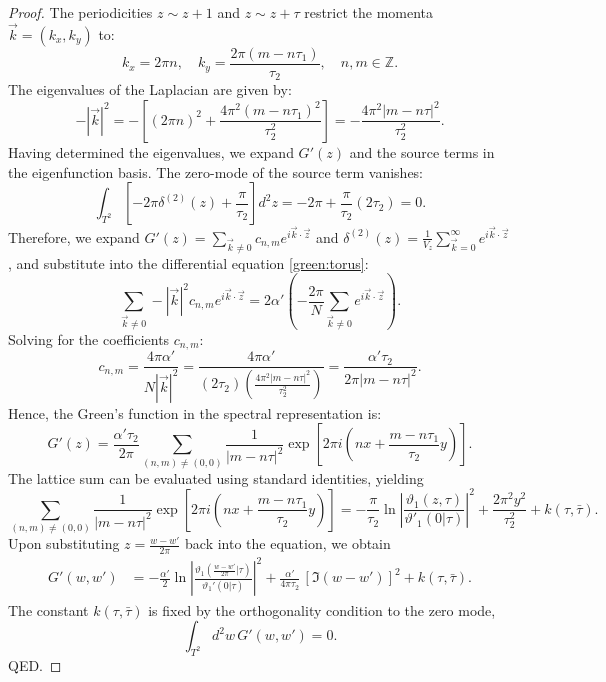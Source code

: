 \begin{tcolorbox}[breakable]
\begin{proof}
The periodicities $z \sim z+1$ and $z \sim z+\tau$ restrict the momenta $\vec{k} = (k_x, k_y)$ to:
\begin{equation}
	k_x = 2\pi n, \quad k_y = \frac{2\pi(m - n\tau_1)}{\tau_2}, \quad n, m \in \mathbb{Z}.
\end{equation}
The eigenvalues of the Laplacian are given by:
\begin{equation}
	-|\vec{k}|^2 = -\left[ (2\pi n)^2 + \frac{4\pi^2(m - n\tau_1)^2}{\tau_2^2} \right] = -\frac{4\pi^2 |m - n\tau|^2}{\tau_2^2}.
\end{equation}
Having determined the eigenvalues, we expand $G'(z)$ and the source terms in the eigenfunction basis. The zero-mode of the source term vanishes:
\begin{equation}
	\int_{T^2} \left[ -2\pi \delta^{(2)}(z) + \frac{\pi}{\tau_2} \right]d^2z = -2\pi + \frac{\pi}{\tau_2}(2\tau_2) = 0.
\end{equation}
Therefore, we expand $G'(z) = \sum_{\vec{k} \neq 0} c_{n,m} e^{i\vec{k} \cdot \vec{z}}$ and $\delta^{(2)}(z)=\frac{1}{V_z}\sum_{\vec{k}=0}^{\infty}e^{i\vec{k}\cdot\vec{z}}$, and substitute into the differential equation \eqref{green:torus}:
\begin{equation}
	\sum_{\vec{k} \neq 0} -|\vec{k}|^2 c_{n,m} e^{i\vec{k} \cdot \vec{z}} = 2\alpha' \left( -\frac{2\pi}{N} \sum_{\vec{k} \neq 0} e^{i\vec{k} \cdot \vec{z}} \right).
\end{equation}
Solving for the coefficients $c_{n,m}$:
\begin{equation}
	c_{n,m} = \frac{4\pi \alpha'}{N |\vec{k}|^2} = \frac{4\pi \alpha'}{(2\tau_2) \left( \frac{4\pi^2 |m - n\tau|^2}{\tau_2^2} \right)} = \frac{\alpha' \tau_2}{2\pi |m - n\tau|^2}.
\end{equation}
Hence, the Green's function in the spectral representation is:
\begin{equation}
	G'(z) = \frac{\alpha' \tau_2}{2\pi} \sum_{(n,m) \neq (0,0)} \frac{1}{|m - n\tau|^2} \exp \left[ 2\pi i \left( nx + \frac{m - n\tau_1}{\tau_2}y \right) \right].
\end{equation}
The lattice sum can be evaluated using standard identities, yielding
\begin{equation}
\sum_{(n,m) \neq (0,0)} \frac{1}{|m - n\tau|^2} \exp \left[ 2\pi i \left( nx + \frac{m - n\tau_1}{\tau_2}y \right) \right] = -\frac{\pi}{\tau_2} \ln \left| \frac{\vartheta_1(z, \tau)}{\vartheta'_1(0|\tau)} \right|^2 + \frac{2\pi^2 y^2}{\tau_2^2} + k(\tau,\bar\tau).
\end{equation}
Upon substituting $z = \frac{w-w'}{2\pi}$ back into the equation, we obtain
\begin{align}
G'(w,w')&=-\frac{\alpha'}{2}\ln\left|\frac{\vartheta_1\!\left(\frac{w-w'}{2\pi}\Big|\tau\right)}{\vartheta_1'(0|\tau)}\right|^2+ \frac{\alpha'}{4\pi\tau_2}\,[\Im(w-w')]^2+ k(\tau,\bar\tau).
\end{align}
The constant $k(\tau,\bar\tau)$ is fixed by the orthogonality condition to the zero mode,
\begin{equation}
	\int_{T^2} d^2 w\, G'(w,w') = 0.
\end{equation}
QED.
\end{proof}
\end{tcolorbox}

